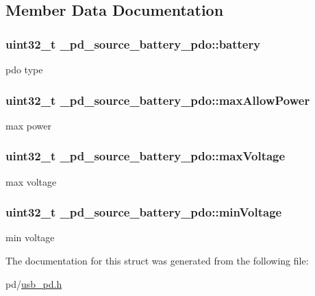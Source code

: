 \subsection{Member Data Documentation}
\hypertarget{struct__pd__source__battery__pdo_a0cae5fa1b6136b1a9db95d182ec7122a}{
\subsubsection[{battery}]{\setlength{\rightskip}{0pt plus 5cm}uint32\-\_\-t \-\_\-pd\-\_\-source\-\_\-battery\-\_\-pdo\-::battery}}\label{struct__pd__source__battery__pdo_a0cae5fa1b6136b1a9db95d182ec7122a}
pdo type \hypertarget{struct__pd__source__battery__pdo_ae4498258205f03a10afdb32e445a57ef}{
\subsubsection[{max\-Allow\-Power}]{\setlength{\rightskip}{0pt plus 5cm}uint32\-\_\-t \-\_\-pd\-\_\-source\-\_\-battery\-\_\-pdo\-::max\-Allow\-Power}}\label{struct__pd__source__battery__pdo_ae4498258205f03a10afdb32e445a57ef}
max power \hypertarget{struct__pd__source__battery__pdo_af818fd645542287499a65f559ef6d571}{
\subsubsection[{max\-Voltage}]{\setlength{\rightskip}{0pt plus 5cm}uint32\-\_\-t \-\_\-pd\-\_\-source\-\_\-battery\-\_\-pdo\-::max\-Voltage}}\label{struct__pd__source__battery__pdo_af818fd645542287499a65f559ef6d571}
max voltage \hypertarget{struct__pd__source__battery__pdo_a5c799cc37ea460e9bfeea8a05242cf54}{
\subsubsection[{min\-Voltage}]{\setlength{\rightskip}{0pt plus 5cm}uint32\-\_\-t \-\_\-pd\-\_\-source\-\_\-battery\-\_\-pdo\-::min\-Voltage}}\label{struct__pd__source__battery__pdo_a5c799cc37ea460e9bfeea8a05242cf54}
min voltage 

The documentation for this struct was generated from the following file\-:\begin{DoxyCompactItemize}
\item 
pd/\hyperlink{usb__pd_8h}{usb\-\_\-pd.\-h}\end{DoxyCompactItemize}
